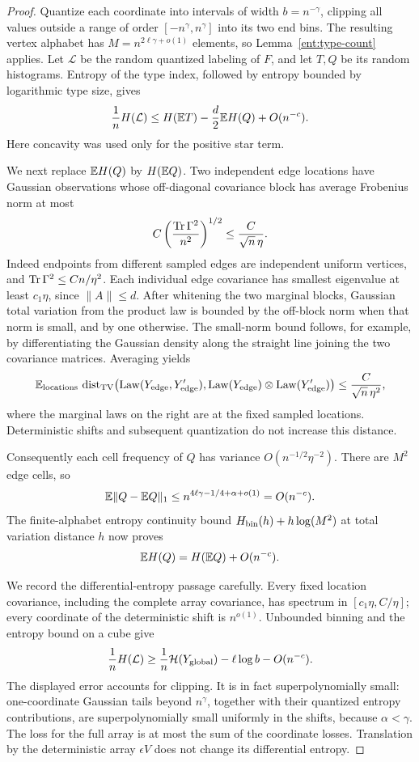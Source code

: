 \begin{proof}
Quantize each coordinate into intervals of width \(b=n^{-\gamma}\),
clipping all values outside a range of order
\([-n^\gamma,n^\gamma]\) into its two end bins. The resulting vertex
alphabet has \(M=n^{2\ell\gamma+o(1)}\) elements, so
Lemma~\ref{ent:type-count} applies. Let \(\mathcal L\) be the random
quantized labeling of \(F\), and let \(T,Q\) be its random histograms.
Entropy of the type index, followed by entropy bounded by logarithmic
type size, gives
\begin{equation}\label{eq:ent-quantized}
 \frac1nH(\mathcal L)
 \le H(\mathbb E T)-\frac d2\mathbb E H(Q)+O(n^{-c}).
\end{equation}
Here concavity was used only for the positive star term.

We next replace \(\mathbb E H(Q)\) by \(H(\mathbb E Q)\). Two independent edge
locations have Gaussian observations whose off-diagonal covariance
block has average Frobenius norm at most
\[
 C\left(\frac{\operatorname{Tr}\Gamma^2}{n^2}\right)^{1/2}
 \le \frac{C}{\sqrt n\,\eta}.
\]
Indeed endpoints from different sampled edges are independent uniform
vertices, and \(\operatorname{Tr}\Gamma^2\le Cn/\eta^2\).
Each individual edge covariance has smallest eigenvalue at least
\(c_1\eta\), since \(\|A\|\le d\).
After whitening the two marginal blocks, Gaussian total variation
from the product law is bounded by the off-block norm when that norm
is small, and by one otherwise. The small-norm bound follows, for
example, by differentiating the Gaussian density along the straight
line joining the two covariance matrices. Averaging yields
\[
 \mathbb E_{\rm locations}\,
 \operatorname{dist}_{\mathrm{TV}}\bigl(\operatorname{Law}(Y_{\rm edge},Y_{\rm edge}'),
                 \operatorname{Law}(Y_{\rm edge})\otimes
                 \operatorname{Law}(Y_{\rm edge}')\bigr)
 \le \frac{C}{\sqrt n\,\eta^2},
\]
where the marginal laws on the right are at the fixed sampled
locations. Deterministic shifts and subsequent quantization do not
increase this distance.

Consequently each cell frequency of \(Q\) has variance
\(O(n^{-1/2}\eta^{-2})\). There are \(M^2\) edge cells, so
\[
 \mathbb E\|Q-\mathbb E Q\|_1
 \le n^{4\ell\gamma-1/4+\alpha+o(1)}=O(n^{-c}).
\]
The finite-alphabet entropy continuity bound
\(H_{\rm bin}(h)+h\log(M^2)\) at total variation distance \(h\)
now proves
\begin{equation}\label{eq:ent-edge-concentration}
 \mathbb E H(Q)=H(\mathbb E Q)+O(n^{-c}).
\end{equation}

We record the differential-entropy passage carefully. Every fixed
location covariance, including the complete array covariance, has
spectrum in \([c_1\eta,C/\eta]\); every coordinate of the deterministic
shift is \(n^{o(1)}\). Unbounded binning and the entropy bound on a cube give
\[
 \frac1nH(\mathcal L)
 \ge \frac1n\mathcal H(Y_{\rm global})
           -\ell\log b-O(n^{-c}).
\]
The displayed error accounts for clipping. It is in fact
superpolynomially small: one-coordinate Gaussian tails beyond
\(n^\gamma\), together with their quantized entropy contributions,
are superpolynomially small uniformly in the shifts, because
\(\alpha<\gamma\). The loss for the full array is at most the sum
of the coordinate losses. Translation by the deterministic array
\(\epsilon V\) does not change its differential entropy.


\end{proof}
